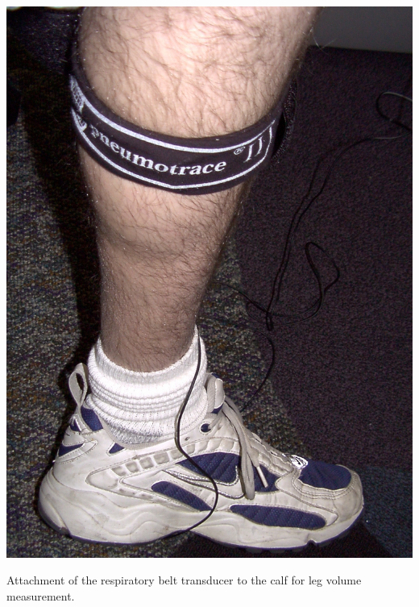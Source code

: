 \documentclass[
  letterpaper,
  DIV=11,
  numbers=noendperiod,
  oneside]{scrartcl}
\begin{document}
\begin{marginfigure}

{\centering \includegraphics{../../images/calf_belt.jpg}

}

\caption{\label{fig-calf}Attachment of the respiratory belt transducer
to the calf for leg volume measurement.}

\end{marginfigure}
\end{document}
